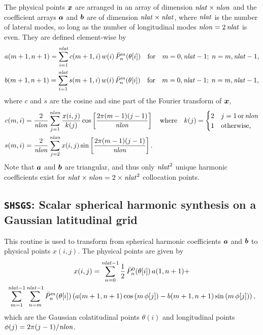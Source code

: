 \documentclass[11pt]{article}
\begin{document}
The physical points $\mbox{\boldmath $x$}$ are arranged in an array of dimension $\mathit{nlat} \times \mathit{nlon}$ and
 the coefficient arrays $\mbox{\boldmath $a$}$ and $\mbox{\boldmath $b$}$ are of dimension $\mathit{nlat} \times \mathit{nlat}$, where $\mathit{nlat}$ is the number of 
lateral modes, so long as the number of longitudinal modes $\mathit{nlon} = 2 \, \mathit{nlat}$ is even. They are defined 
element-wise by
\begin{gather}
	a(m+1,n+1) = \sum_{i=1}^{\mathit{nlat}} c(m+1,i) \, w(i) \, \bar{P}_n^m(\theta[i]) 
	\quad \text{for} \quad m=0,\mathit{nlat}-1; \; n=m,\mathit{nlat}-1, \\
	b(m+1,n+1) = \sum_{i=1}^{\mathit{nlat}} s(m+1,i) \, w(i) \, \bar{P}_n^m(\theta[i]) 
	\quad \text{for} \quad m=0,\mathit{nlat}-1; \; n=m,\mathit{nlat}-1,
\end{gather}
where $c$ and $s$ are the cosine and sine part of the Fourier transform of $\mbox{\boldmath $x$}$, 
\begin{align}
	c(m,i) &= \frac{2}{\mathit{nlon}} \sum_{j=1}^{\mathit{nlon}} \frac{x(i,j)}{k(j)} \cos\left[ \frac{2 \pi (m-1)(j-1)}{\mathit{nlon}} \right] 
	\quad \text{where} \quad
	k(j) = \begin{cases} 2 & j=1 \, \text{or} \, \mathit{nlon} \\ 1 & \text{otherwise,} \end{cases}\\
	s(m,i) &= \frac{2}{\mathit{nlon}} \sum_{j=2}^{\mathit{nlon}} x(i,j) \sin\left[ \frac{2 \pi (m-1)(j-1)}{\mathit{nlon}} \right].
\end{align}
Note that $\mbox{\boldmath $a$}$ and $\mbox{\boldmath $b$}$ are triangular, and thus only $\mathit{nlat}^2$ unique harmonic 
coefficients exist for $\mathit{nlat} \times \mathit{nlon} = 2 \times \mathit{nlat}^2$ collocation points. 

\subsection*{\texttt{SHSGS}: Scalar spherical harmonic {\color{red}synthesis} on a Gaussian latitudinal grid}

This routine is used to transform from spherical harmonic coefficients $\mbox{\boldmath $a$}$ and $\mbox{\boldmath $b$}$ to 
physical points $x(i,j)$.  The physical points are given by
\begin{multline}
	x(i,j) = \sum_{n=0}^{\mathit{nlat}-1} \frac{1}{2} \, \bar{P}_{n}^0(\theta[i]) \, a(1,n+1) + \\
		\sum_{m=1}^{\mathit{nlat}-1} \sum_{n=m}^{\mathit{nlat}-1} \bar{P}_{n}^m(\theta[i])  \left(a(m+1,n+1) \cos\left( m \, \phi[j] \right)
		- b(m+1,n+1) \sin\left( m \, \phi[j] \right) \right),
\end{multline}
which are the Gaussian colatitudinal points $\theta(i)$ and longitudinal points $\phi(j) = 2 \pi (j-1) / \mathit{nlon}$.
	
\end{document}
